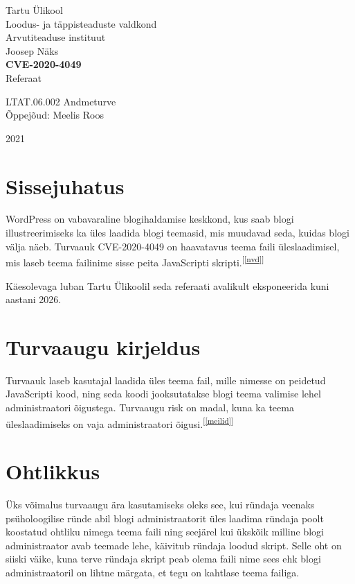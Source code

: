 \documentclass[12pt]{article}
\begin{document}
\begin{center}
\thispagestyle{empty}
\large{Tartu Ülikool}\\[-0.9ex]
\large{Loodus- ja täppisteaduste valdkond}\\
\large{Arvutiteaduse instituut}\\
\vspace{6cm}
\large{Joosep Näks}\\
\textbf{\LARGE{CVE-2020-4049}}\\
Referaat
\end{center}
\vspace{1.5cm}
\begin{flushright}
LTAT.06.002 Andmeturve\\
Õppejõud: Meelis Roos
\end{flushright}
\vspace{6cm}
\begin{center}
2021
\end{center}
\pagebreak

\tableofcontents

\pagebreak

\section{Sissejuhatus}

WordPress on vabavaraline blogihaldamise keskkond, kus saab blogi illustreerimiseks ka üles laadida blogi teemasid, mis muudavad seda, kuidas blogi välja näeb. Turvaauk CVE-2020-4049 on haavatavus teema faili üleslaadimisel, mis laseb teema failinime sisse peita JavaScripti skripti.\textsuperscript{[\ref{nvd}]}

Käesolevaga luban Tartu Ülikoolil seda referaati avalikult eksponeerida kuni aastani 2026.
\section{Turvaaugu kirjeldus}
Turvaauk laseb kasutajal laadida üles teema fail, mille nimesse on peidetud JavaScripti kood, ning seda koodi jooksutatakse blogi teema valimise lehel administraatori õigustega. Turvaaugu risk on madal, kuna ka teema üleslaadimiseks on vaja administraatori õigusi.\textsuperscript{[\ref{meilid}]}
\section{Ohtlikkus}

Üks võimalus turvaaugu ära kasutamiseks oleks see, kui ründaja veenaks psüholoogilise ründe abil blogi administraatorit üles laadima ründaja poolt koostatud ohtliku nimega teema faili ning seejärel kui ükskõik milline blogi administraator avab teemade lehe, käivitub ründaja loodud skript. Selle oht on siiski väike, kuna terve ründaja skript peab olema faili nime sees ehk blogi administraatoril on lihtne märgata, et tegu on kahtlase teema failiga.
\pagebreak
\end{document}
